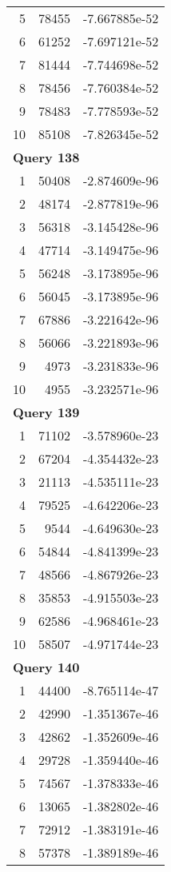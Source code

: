 \begin{longtable}[{p}]{@{}rrp{}@{}}
5 & 78455 & -7.667885e-52 \\
6 & 61252 & -7.697121e-52 \\
7 & 81444 & -7.744698e-52 \\
8 & 78456 & -7.760384e-52 \\
9 & 78483 & -7.778593e-52 \\
10 & 85108 & -7.826345e-52 \\
\midrule
\multicolumn{3}{l}{\bfseries Query 138} \\
1 & 50408 & -2.874609e-96 \\
2 & 48174 & -2.877819e-96 \\
3 & 56318 & -3.145428e-96 \\
4 & 47714 & -3.149475e-96 \\
5 & 56248 & -3.173895e-96 \\
6 & 56045 & -3.173895e-96 \\
7 & 67886 & -3.221642e-96 \\
8 & 56066 & -3.221893e-96 \\
9 & 4973 & -3.231833e-96 \\
10 & 4955 & -3.232571e-96 \\
\midrule
\multicolumn{3}{l}{\bfseries Query 139} \\
1 & 71102 & -3.578960e-23 \\
2 & 67204 & -4.354432e-23 \\
3 & 21113 & -4.535111e-23 \\
4 & 79525 & -4.642206e-23 \\
5 & 9544 & -4.649630e-23 \\
6 & 54844 & -4.841399e-23 \\
7 & 48566 & -4.867926e-23 \\
8 & 35853 & -4.915503e-23 \\
9 & 62586 & -4.968461e-23 \\
10 & 58507 & -4.971744e-23 \\
\midrule
\multicolumn{3}{l}{\bfseries Query 140} \\
1 & 44400 & -8.765114e-47 \\
2 & 42990 & -1.351367e-46 \\
3 & 42862 & -1.352609e-46 \\
4 & 29728 & -1.359440e-46 \\
5 & 74567 & -1.378333e-46 \\
6 & 13065 & -1.382802e-46 \\
7 & 72912 & -1.383191e-46 \\
8 & 57378 & -1.389189e-46 \\

\end{longtable}
